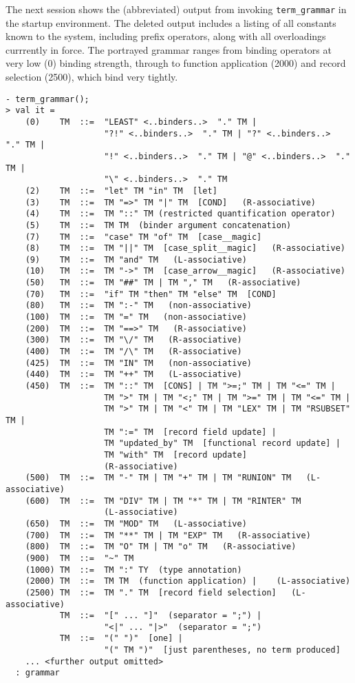 The next session shows the (abbreviated) output from invoking
\verb+term_grammar+ in the startup \HOL{} environment. The deleted output
includes a listing of  all constants known to the system,
including prefix operators, along with all overloadings currrently in
force. The portrayed grammar ranges from binding operators at very low (0) binding
strength, through to function application (2000) and record selection
(2500), which bind very tightly.


\begin{session}
\begin{verbatim}
- term_grammar();
> val it =
    (0)    TM  ::=  "LEAST" <..binders..>  "." TM |
                    "?!" <..binders..>  "." TM | "?" <..binders..>  "." TM |
                    "!" <..binders..>  "." TM | "@" <..binders..>  "." TM |
                    "\" <..binders..>  "." TM
    (2)    TM  ::=  "let" TM "in" TM  [let]
    (3)    TM  ::=  TM "=>" TM "|" TM  [COND]   (R-associative)
    (4)    TM  ::=  TM "::" TM (restricted quantification operator)
    (5)    TM  ::=  TM TM  (binder argument concatenation)
    (7)    TM  ::=  "case" TM "of" TM  [case__magic]
    (8)    TM  ::=  TM "||" TM  [case_split__magic]   (R-associative)
    (9)    TM  ::=  TM "and" TM   (L-associative)
    (10)   TM  ::=  TM "->" TM  [case_arrow__magic]   (R-associative)
    (50)   TM  ::=  TM "##" TM | TM "," TM   (R-associative)
    (70)   TM  ::=  "if" TM "then" TM "else" TM  [COND]
    (80)   TM  ::=  TM ":-" TM   (non-associative)
    (100)  TM  ::=  TM "=" TM   (non-associative)
    (200)  TM  ::=  TM "==>" TM   (R-associative)
    (300)  TM  ::=  TM "\/" TM   (R-associative)
    (400)  TM  ::=  TM "/\" TM   (R-associative)
    (425)  TM  ::=  TM "IN" TM   (non-associative)
    (440)  TM  ::=  TM "++" TM   (L-associative)
    (450)  TM  ::=  TM "::" TM  [CONS] | TM ">=;" TM | TM "<=" TM |
                    TM ">" TM | TM "<;" TM | TM ">=" TM | TM "<=" TM |
                    TM ">" TM | TM "<" TM | TM "LEX" TM | TM "RSUBSET" TM |
                    TM ":=" TM  [record field update] |
                    TM "updated_by" TM  [functional record update] |
                    TM "with" TM  [record update]
                    (R-associative)
    (500)  TM  ::=  TM "-" TM | TM "+" TM | TM "RUNION" TM   (L-associative)
    (600)  TM  ::=  TM "DIV" TM | TM "*" TM | TM "RINTER" TM
                    (L-associative)
    (650)  TM  ::=  TM "MOD" TM   (L-associative)
    (700)  TM  ::=  TM "**" TM | TM "EXP" TM   (R-associative)
    (800)  TM  ::=  TM "O" TM | TM "o" TM   (R-associative)
    (900)  TM  ::=  "~" TM
    (1000) TM  ::=  TM ":" TY  (type annotation)
    (2000) TM  ::=  TM TM  (function application) |    (L-associative)
    (2500) TM  ::=  TM "." TM  [record field selection]   (L-associative)
           TM  ::=  "[" ... "]"  (separator = ";") |
                    "<|" ... "|>"  (separator = ";")
           TM  ::=  "(" ")"  [one] |
                    "(" TM ")"  [just parentheses, no term produced]
    ... <further output omitted>
  : grammar
\end{verbatim}
\end{session}

